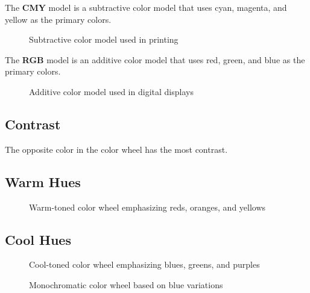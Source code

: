   \begin{example}
    The \textbf{CMY} model is a subtractive color model that uses cyan, magenta, and yellow as the primary colors. 
    \begin{figure}[H]
      \centering 
      \caption{Subtractive color model used in printing} 
    \end{figure}
  \end{example}

  \begin{example}
    The \textbf{RGB} model is an additive color model that uses red, green, and blue as the primary colors. 
    \begin{figure}[H]
      \centering 
      \caption{Additive color model used in digital displays} 
    \end{figure}
  \end{example} 

\subsection{Contrast}

  The opposite color in the color wheel has the most contrast. 


\subsection{Warm Hues} 

  \begin{example}
    \begin{figure}[H]
      \centering 
      \caption{Warm-toned color wheel emphasizing reds, oranges, and yellows} 
    \end{figure}
  \end{example}

\subsection{Cool Hues}

  \begin{example}
    \begin{figure}[H]
      \centering 
      \caption{Cool-toned color wheel emphasizing blues, greens, and purples} 
    \end{figure}
  \end{example}

  \begin{example}
    \begin{figure}[H]
      \centering 
      \caption{Monochromatic color wheel based on blue variations} 
    \end{figure}
  \end{example}
